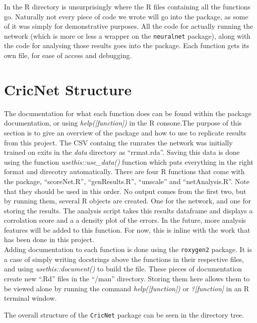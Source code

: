 
In the R directory is unsurprisingly where the R files containing all the functions go. Naturally not every piece of code we wrote will go into the package, as some of it was simply for demonstrative purposes. All the code for actually running the network (which is more or less a wrapper on the \verb|neuralnet| package), along with the code for analysing those results goes into the package.
Each function gets its own file, for ease of access and debugging. 

\section{CricNet Structure}

The documentation for what each function does can be found within the package documentation, or using \textit{help([function])} in the R consone.The purpose of this section is to give an overview of the package and how to use to replicate results from this project.
The CSV containg the runrates the network was initially trained on exits in the \textit{data} directory as ``rrmat.rda''. Saving this data is done using the function \textit{usethis::use_data()} function which puts everything in the right format and direcotry automatically. There are four R functions that come with the package, ``scoreNet.R'', ``genResults.R'', ``unscale'' and ``netAnalysis.R''. Note that they should be used in this order. No output comes from the first two, but by running them, several R objects are created. One for the network, and one for storing the results. The analysis script takes this results dataframe and displays a corrolation score and a a density plot of the errors. In the future, more analysis features will be added to this function. For now, this is inline with the work that has been done in this project. \\

Adding documentation to each function is done using the \verb|roxygen2| package. It is a case of simply writing docstrings above the functions in their respective files, and using \textit{usethis::document()} to build the file. These pieces of documentation create new ``.Rd'' files in the ``/man'' directory. Storing them here allows them to be viewed alone by running the command \textit{help([function])} or \textit{?[function]} in an R terminal window. 

The overall structure of the \verb|CricNet| package can be seen in the directory tree.

